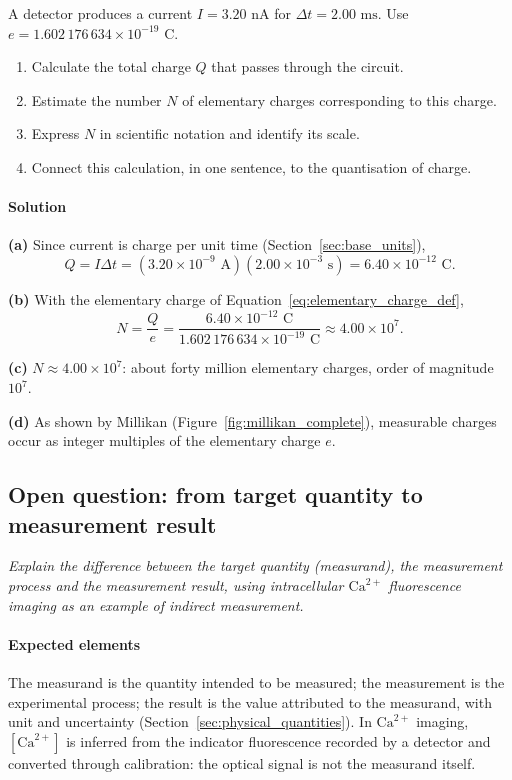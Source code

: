 A detector produces a current $I = 3.20\text{ nA}$ for $\Delta t = 2.00\text{ ms}$. Use $e = 1.602\,176\,634 \times 10^{-19}\text{ C}$.
\begin{enumerate}[label=(\alph*)]
    \item Calculate the total charge $Q$ that passes through the circuit.
    \item Estimate the number $N$ of elementary charges corresponding to this charge.
    \item Express $N$ in scientific notation and identify its scale.
    \item Connect this calculation, in one sentence, to the quantisation of charge.
\end{enumerate}

\paragraph{Solution} \textbf{(a)} Since current is charge per unit time (Section~\ref{sec:base_units}),
\begin{equation*}
Q = I\Delta t = (3.20 \times 10^{-9}\text{ A})(2.00 \times 10^{-3}\text{ s}) = 6.40 \times 10^{-12}\text{ C}.
\end{equation*}

\textbf{(b)} With the elementary charge of Equation~\eqref{eq:elementary_charge_def},
\begin{equation*}
N = \frac{Q}{e} = \frac{6.40 \times 10^{-12}\text{ C}}{1.602\,176\,634 \times 10^{-19}\text{ C}} \approx 4.00 \times 10^{7}.
\end{equation*}

\textbf{(c)} $N \approx 4.00 \times 10^7$: about forty million elementary charges, order of magnitude $10^7$.

\textbf{(d)} As shown by Millikan (Figure~\ref{fig:millikan_complete}), measurable charges occur as integer multiples of the elementary charge $e$.

\subsection{Open question: from target quantity to measurement result}

\emph{Explain the difference between the target quantity (measurand), the measurement process and the measurement result, using intracellular $\text{Ca}^{2+}$ fluorescence imaging as an example of indirect measurement.}

\paragraph{Expected elements} The measurand is the quantity intended to be measured; the measurement is the experimental process; the result is the value attributed to the measurand, with unit and uncertainty (Section~\ref{sec:physical_quantities}). In $\text{Ca}^{2+}$ imaging, $[\text{Ca}^{2+}]$ is inferred from the indicator fluorescence recorded by a detector and converted through calibration: the optical signal is not the measurand itself.

